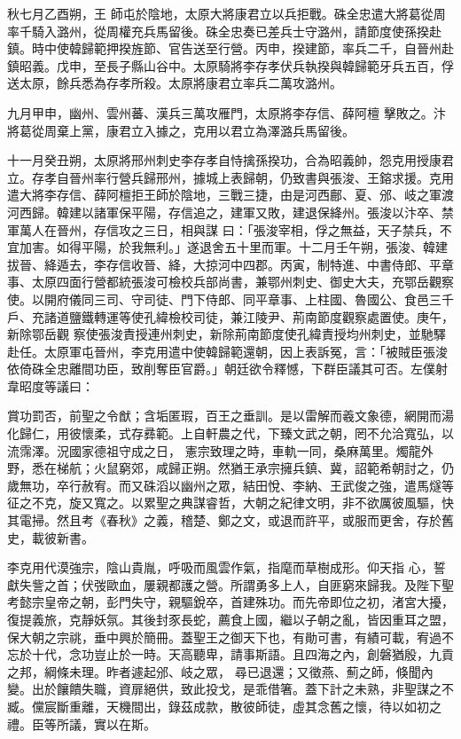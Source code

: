 \begin{pinyinscope}
 秋七月乙酉朔，王
 師屯於陰地，太原大將康君立以兵拒戰。硃全忠遣大將葛從周率千騎入潞州，從周權充兵馬留後。硃全忠奏已差兵士守潞州，請節度使孫揆赴鎮。時中使韓歸範押揆旌節、官告送至行營。丙申，揆建節，率兵二千，自晉州赴鎮昭義。戊申，至長子縣山谷中。太原騎將李存孝伏兵執揆與韓歸範牙兵五百，俘送太原，餘兵悉為存孝所殺。太原將康君立率兵二萬攻潞州。



 九月甲申，幽州、雲州蕃、漢兵三萬攻雁門，太原將李存信、薛阿檀
 擊敗之。汴將葛從周棄上黨，康君立入據之，克用以君立為澤潞兵馬留後。



 十一月癸丑朔，太原將邢州刺史李存孝自恃擒孫揆功，合為昭義帥，怨克用授康君立。存孝自晉州率行營兵歸邢州，據城上表歸朝，仍致書與張浚、王鎔求援。克用遣大將李存信、薛阿檀拒王師於陰地，三戰三捷，由是河西鄜、夏、邠、岐之軍渡河西歸。韓建以諸軍保平陽，存信追之，建軍又敗，建退保絳州。張浚以汴卒、禁軍萬人在晉州，存信攻之三日，相與謀
 曰：「張浚宰相，俘之無益，天子禁兵，不宜加害。如得平陽，於我無利。」遂退舍五十里而軍。十二月壬午朔，張浚、韓建拔晉、絳遁去，李存信收晉、絳，大掠河中四郡。丙寅，制特進、中書侍郎、平章事、太原四面行營都統張浚可檢校兵部尚書，兼鄂州刺史、御史大夫，充鄂岳觀察使。以開府儀同三司、守司徒、門下侍郎、同平章事、上柱國、魯國公、食邑三千戶、充諸道鹽鐵轉運等使孔緯檢校司徒，兼江陵尹、荊南節度觀察處置使。庚午，新除鄂岳觀
 察使張浚責授連州刺史，新除荊南節度使孔緯責授均州刺史，並馳驛赴任。太原軍屯晉州，李克用遣中使韓歸範還朝，因上表訴冤，言：「被賊臣張浚依倚硃全忠離間功臣，致削奪臣官爵。」朝廷欲令釋憾，下群臣議其可否。左僕射韋昭度等議曰：



 賞功罰否，前聖之令猷；含垢匿瑕，百王之垂訓。是以雷解而羲文象德，網開而湯化歸仁，用彼懷柔，式存彞範。上自軒農之代，下臻文武之朝，罔不允洽寬弘，以流霈澤。況國家德祖守成之日，
 憲宗致理之時，車軌一同，桑麻萬里。燭龍外野，悉在梯航；火鼠窮郊，咸歸正朔。然猶王承宗擁兵鎮、冀，詔範希朝討之，仍歲無功，卒行赦宥。而又硃滔以幽州之眾，結田悅、李納、王武俊之強，遣馬燧等征之不克，旋又寬之。以累聖之典謀睿哲，大朝之紀律文明，非不欲厲彼風驅，快其電掃。然且考《春秋》之義，稽楚、鄭之文，或退而許平，或服而更舍，存於舊史，載彼新書。



 李克用代漠強宗，陰山貴胤，呼吸而風雲作氣，指麾而草樹成形。仰天指
 心，誓獻失訾之首；伏弢歐血，屢親都護之營。所謂勇多上人，自匪窮來歸我。及陛下聖考懿宗皇帝之朝，彭門失守，親驅銳卒，首建殊功。而先帝即位之初，渚宮大擾，復提義旅，克靜妖氛。其後封豕長蛇，薦食上國，繼以子朝之亂，皆因重耳之盟，保大朝之宗祧，垂中興於簡冊。蓋聖王之御天下也，有勛可書，有績可載，宥過不忘於十代，念功豈止於一時。天高聽卑，請事斯語。且四海之內，創磐猶殷，九貢之邦，綱條未理。昨者遽起邠、岐之眾，
 尋已退還；又徵燕、薊之師，倏聞內變。出於饟饋失職，資扉絕供，致此投戈，是乖借箸。蓋下計之未熟，非聖謀之不臧。儻宸斷重離，天機間出，錄茲成款，散彼師徒，虛其念舊之懷，待以如初之禮。臣等所議，實以在斯。




\end{pinyinscope}
